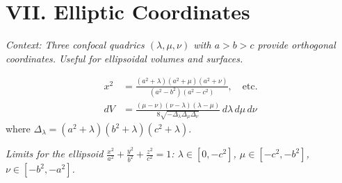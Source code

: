\documentclass[11pt, a4paper]{article}
\begin{document}
\vspace{0.3cm}

\section*{\color{primary} VII. Elliptic Coordinates}

\textit{\small Context: Three confocal quadrics $(\lambda, \mu, \nu)$ with $a>b>c$ provide orthogonal coordinates. Useful for ellipsoidal volumes and surfaces.}

\begin{align*}
    x^2 &= \frac{(a^2+\lambda)(a^2+\mu)(a^2+\nu)}{(a^2-b^2)(a^2-c^2)}, \quad \text{etc.} \\
    dV &= \frac{(\mu-\nu)(\nu-\lambda)(\lambda-\mu)}{8\sqrt{-\Delta_\lambda \Delta_\mu \Delta_\nu}}\,d\lambda\,d\mu\,d\nu
\end{align*}
where $\Delta_\lambda = (a^2+\lambda)(b^2+\lambda)(c^2+\lambda)$.

\textit{\small Limits for the ellipsoid $\frac{x^2}{a^2}+\frac{y^2}{b^2}+\frac{z^2}{c^2}=1$: $\lambda \in [0,-c^2]$, $\mu \in [-c^2,-b^2]$, $\nu \in [-b^2,-a^2]$.}
\end{document}
